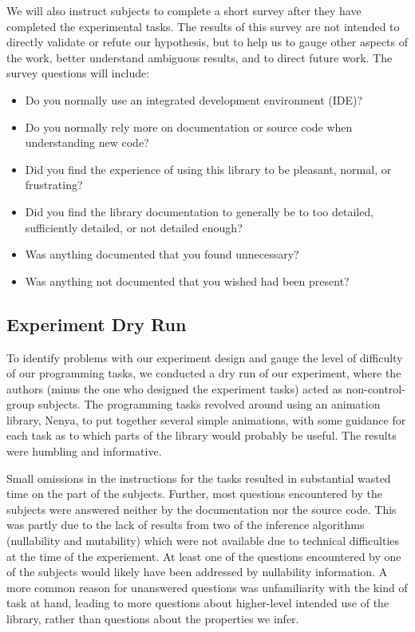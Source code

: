 We will also instruct subjects to complete a short survey after they have
completed the experimental tasks. The results of this survey are not intended
to directly validate or refute our hypothesis, but to help us to gauge other
aspects of the work, better understand ambiguous results, and to direct future
work. The survey questions will include:

\begin{itemize}
\item Do you normally use an integrated development environment (IDE)?
\item Do you normally rely more on documentation or source code when
  understanding new code?
\item Did you find the experience of using this library to be pleasant, normal,
  or frustrating?
\item Did you find the library documentation to generally be to too detailed,
  sufficiently detailed, or not detailed enough?
\item Was anything documented that you found unnecessary?
\item Was anything not documented that you wished had been present?
\end{itemize}

\subsection{Experiment Dry Run}

To identify problems with our experiment design and gauge the level of
difficulty of our programming tasks, we conducted a dry run of our experiment,
where the authors (minus the one who designed the experiment tasks) acted as
non-control-group subjects. 
The programming tasks revolved around using an animation library, Nenya, to put
together several simple animations, with some guidance for each task as to which
parts of the library would probably be useful.
The results were humbling and informative.

Small omissions in the instructions for the tasks resulted in substantial
wasted time on the part of the subjects. Further, most questions encountered by
the subjects were answered neither by the documentation nor the
source code. This was partly due to the lack of results from two of the
inference algorithms (nullability and mutability) which were not available due
to technical difficulties at the time of the experiement. At least one of the
questions encountered by one of the subjects would likely have been addressed
by nullability information.  A more common reason for unanswered questions was
unfamiliarity with the kind of task at hand, leading to more questions about
higher-level intended use of the library, rather than questions about the
properties we infer.

